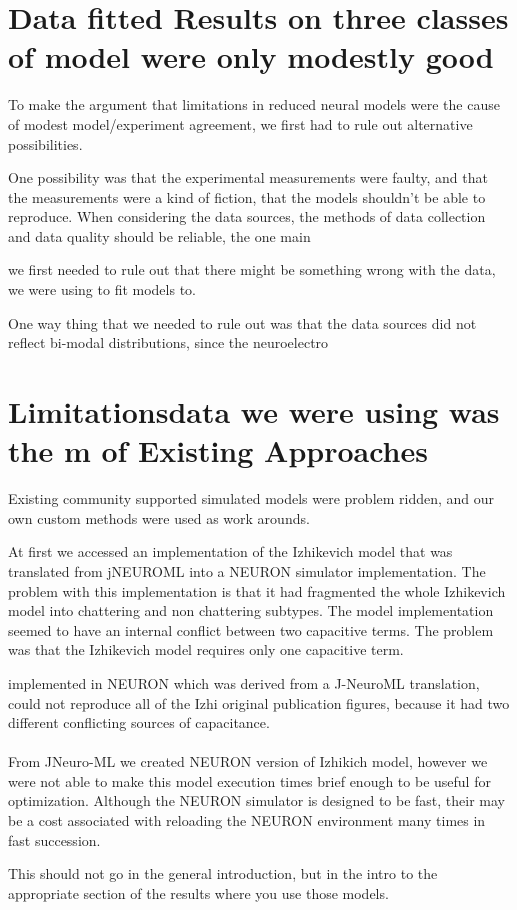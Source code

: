 
\section{Data fitted Results on three classes of model were only modestly good}

To make the argument that limitations in reduced neural models were the cause of modest model/experiment agreement, we first had to rule out alternative possibilities.

One possibility was that the experimental measurements were faulty, and that the measurements were a kind of fiction, that the models shouldn't be able to reproduce. When considering the data sources, the methods of data collection and data quality should be reliable, the one main 

we first needed to rule out that there might be something wrong with the data, we were using to fit models to.

One way thing that we needed to rule out was that the data sources did not reflect bi-modal distributions, since the neuroelectro 




\section{Limitationsdata we were using was the m of Existing Approaches} 
Existing community supported simulated models were problem ridden, and our own custom methods were used as work arounds.


At first we accessed an implementation of the Izhikevich model that was translated from jNEUROML into a NEURON simulator implementation. The problem with this implementation is that it had fragmented the whole Izhikevich model into chattering and non chattering subtypes. The model implementation seemed to have an internal conflict between two capacitive terms. The problem was that the Izhikevich model requires only one capacitive term.

implemented in NEURON which was derived from a J-NeuroML translation, could not reproduce all of the Izhi original publication figures, because it had two different conflicting sources of capacitance.\\
\\
From JNeuro-ML we created NEURON version of Izhikich model, however we were not able to make this model execution times brief enough to be useful for optimization. Although the NEURON simulator is designed to be fast, their may be a cost associated with reloading the NEURON environment many times in fast succession.

This should not go in the general introduction, but in the intro to the appropriate section of the results where you use those models.